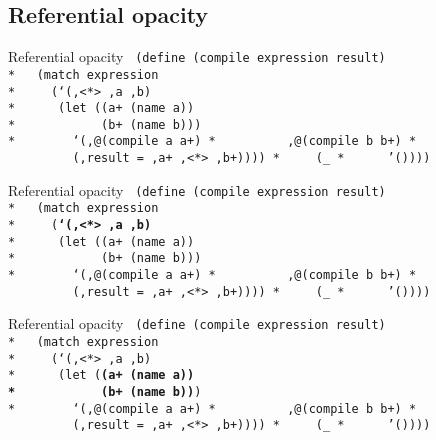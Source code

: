 
\subsection{Referential opacity}

\begin{frame}{Referential opacity}
  \texttt{
    (define (compile expression result) \\*
    \ \ (match expression \\*
    \ \ \ \ (`(,<*> ,a ,b) \\*
    \ \ \ \ \ (let ((a+ (name a)) \\*
    \ \ \ \ \ \ \ \ \ \ \ (b+ (name b))) \\*
    \ \ \ \ \ \ \ `(,@(compile a a+)\\*
    \ \ \ \ \ \ \ \ \ ,@(compile b b+)\\*
    \ \ \ \ \ \ \ \ \ (,result = ,a+ ,<*> ,b+))))\\*
    \ \ \ \ (\_\\*
    \ \ \ \ \ '())))
  }
\end{frame}

\begin{frame}{Referential opacity}
  \texttt{
    (define (compile expression result) \\*
    \ \ (match expression \\*
    \ \ \ \ (\textbf{`(,<*> ,a ,b)} \\*
    \ \ \ \ \ (let ((a+ (name a)) \\*
    \ \ \ \ \ \ \ \ \ \ \ (b+ (name b))) \\*
    \ \ \ \ \ \ \ `(,@(compile a a+)\\*
    \ \ \ \ \ \ \ \ \ ,@(compile b b+)\\*
    \ \ \ \ \ \ \ \ \ (,result = ,a+ ,<*> ,b+))))\\*
    \ \ \ \ (\_\\*
    \ \ \ \ \ '())))
  }
\end{frame}

\begin{frame}{Referential opacity}
  \texttt{
    (define (compile expression result) \\*
    \ \ (match expression \\*
    \ \ \ \ (`(,<*> ,a ,b) \\*
    \ \ \ \ \ (let (\textbf{(a+ (name a)) \\*
    \ \ \ \ \ \ \ \ \ \ \ (b+ (name b))}) \\*
    \ \ \ \ \ \ \ `(,@(compile a a+)\\*
    \ \ \ \ \ \ \ \ \ ,@(compile b b+)\\*
    \ \ \ \ \ \ \ \ \ (,result = ,a+ ,<*> ,b+))))\\*
    \ \ \ \ (\_\\*
    \ \ \ \ \ '())))
  }
\end{frame}

